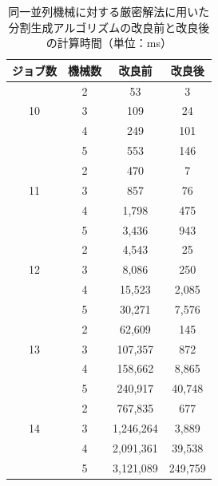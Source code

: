 \documentclass[12pt]{optlab-bachelor}
\begin{document}
\begin{table}[htb]
  \begin{center}
    \begin{tabular}{|c|c|c|c|} \hline
      ジョブ数 & 機械数 & 改良前 & 改良後 \\ \hline \hline
      & 2 & 53 & 3  \\ \cline{2-4}
      10 & 3 & 109 & 24  \\ \cline{2-4}
      & 4 & 249 & 101  \\ \cline{2-4}
      & 5 & 553 & 146  \\ \hline \hline
      & 2 & 470 & 7  \\ \cline{2-4}
      11 & 3 & 857 & 76 \\ \cline{2-4}
      & 4 & 1,798 & 475  \\ \cline{2-4}
      & 5 & 3,436 & 943  \\ \hline \hline
      & 2 & 4,543 & 25  \\ \cline{2-4}
      12 & 3 & 8,086 & 250  \\ \cline{2-4}
      & 4 & 15,523 & 2,085 \\ \cline{2-4}
      & 5 & 30,271 & 7,576   \\ \hline \hline
      & 2 & 62,609 & 145 \\ \cline{2-4}
      13 & 3 & 107,357 & 872 \\ \cline{2-4}
      & 4 & 158,662 & 8,865 \\ \cline{2-4}
      & 5 & 240,917 & 40,748 \\ \hline \hline
      & 2 & 767,835 & 677 \\ \cline{2-4}
      14 & 3 & 1,246,264 & 3,889 \\ \cline{2-4}
      & 4 & 2,091,361 & 39,538 \\ \cline{2-4}
      & 5 & 3,121,089 & 249,759  \\ \hline \hline
    \end{tabular}
    \caption{同一並列機械に対する厳密解法に用いた分割生成アルゴリズムの改良前と改良後の計算時間（単位：ms）}
    \label{A1}
  \end{center}
\end{table}
\end{document}
